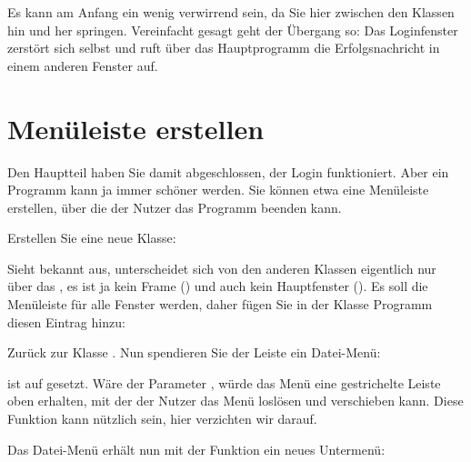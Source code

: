 Es kann am Anfang ein wenig verwirrend sein, da Sie hier zwischen den Klassen hin und her springen. Vereinfacht gesagt geht der Übergang so: Das Loginfenster zerstört sich selbst und ruft über das Hauptprogramm die Erfolgsnachricht in einem anderen Fenster auf.


\section{Menüleiste erstellen}


Den Hauptteil haben Sie damit abgeschlossen, der Login funktioniert. Aber ein Programm kann ja immer schöner werden. Sie können etwa eine Menüleiste erstellen, über die der Nutzer das Programm beenden kann.

Erstellen Sie eine neue Klasse:

\medskip




\medskip
	           
Sieht bekannt aus, unterscheidet sich von den anderen Klassen eigentlich nur über das , es ist ja kein Frame () und auch kein Hauptfenster (). Es soll die Menüleiste für alle Fenster werden, daher fügen Sie in der Klasse Programm diesen Eintrag hinzu:

\medskip


\medskip

Zurück zur Klasse . Nun spendieren Sie der Leiste ein Datei-Menü:

\medskip


\medskip

 ist auf  gesetzt. Wäre der Parameter , würde das Menü eine gestrichelte Leiste oben erhalten, mit der der Nutzer das Menü loslösen und verschieben kann. Diese Funktion kann nützlich sein, hier verzichten wir darauf.

Das Datei-Menü erhält nun mit der Funktion  ein neues Untermenü:

\medskip


